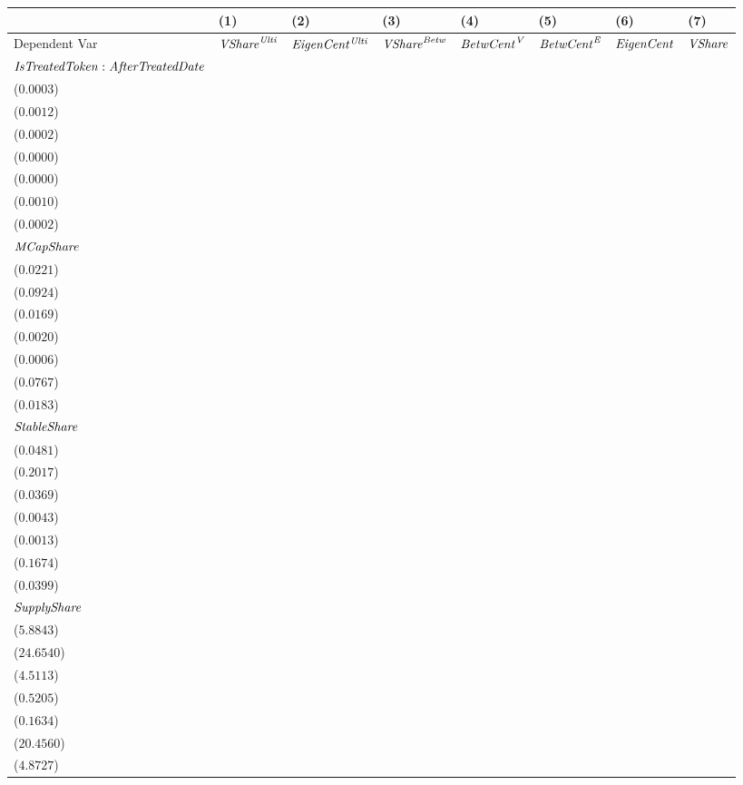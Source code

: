 \begin{tabular}{llllllll}
\toprule
 & (1) & (2) & (3) & (4) & (5) & (6) & (7) \\
\midrule
Dependent Var & ${\it {VShare}^{\it Ulti}}$ & ${\it EigenCent^{\it Ulti}}$ & ${\it VShare}^{\it Betw}$ & ${\it BetwCent}^{\it V}$ & ${\it BetwCent}^{\it E}$ & ${\it EigenCent}$ & ${\it VShare}$ \\
${\it IsTreatedToken}:{\it AfterTreatedDate}$ & \makecell{$0.0044^{***}$ \\ ($0.0003$)} & \makecell{$0.0183^{***}$ \\ ($0.0012$)} & \makecell{$-0.0007^{***}$ \\ ($0.0002$)} & \makecell{$-0.0001^{***}$ \\ ($0.0000$)} & \makecell{$-0.0000^{**}$ \\ ($0.0000$)} & \makecell{$0.0149^{***}$ \\ ($0.0010$)} & \makecell{$0.0036^{***}$ \\ ($0.0002$)} \\
${\it MCapShare}$ & \makecell{$0.1343^{***}$ \\ ($0.0221$)} & \makecell{$0.5707^{***}$ \\ ($0.0924$)} & \makecell{$0.0267^{}$ \\ ($0.0169$)} & \makecell{$0.0034^{*}$ \\ ($0.0020$)} & \makecell{$0.0010^{}$ \\ ($0.0006$)} & \makecell{$0.5434^{***}$ \\ ($0.0767$)} & \makecell{$0.1123^{***}$ \\ ($0.0183$)} \\
${\it StableShare}$ & \makecell{$-0.6004^{***}$ \\ ($0.0481$)} & \makecell{$-2.6058^{***}$ \\ ($0.2017$)} & \makecell{$-0.3409^{***}$ \\ ($0.0369$)} & \makecell{$-0.0415^{***}$ \\ ($0.0043$)} & \makecell{$-0.0118^{***}$ \\ ($0.0013$)} & \makecell{$-2.2642^{***}$ \\ ($0.1674$)} & \makecell{$-0.4750^{***}$ \\ ($0.0399$)} \\
${\it SupplyShare}$ & \makecell{$-29.2607^{***}$ \\ ($5.8843$)} & \makecell{$-119.6305^{***}$ \\ ($24.6540$)} & \makecell{$6.4639^{}$ \\ ($4.5113$)} & \makecell{$0.7215^{}$ \\ ($0.5205$)} & \makecell{$0.3142^{*}$ \\ ($0.1634$)} & \makecell{$-93.0239^{***}$ \\ ($20.4560$)} & \makecell{$-22.7874^{***}$ \\ ($4.8727$)} \\

\end{tabular}
